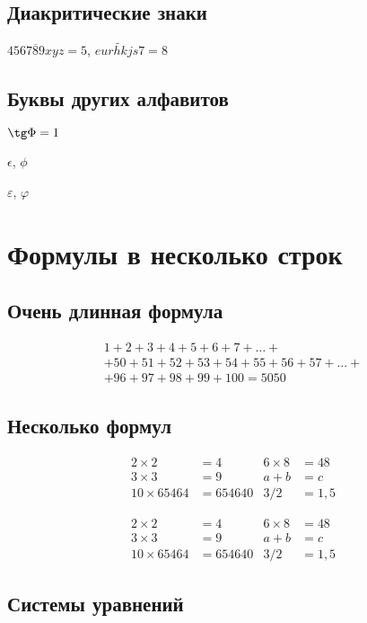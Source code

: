 \documentclass[a4paper,12pt]{article} %
\begin{document}
\subsection{Диакритические знаки}

$\overline{456789xyz}=5$, $\widetilde{eurhkjs7} = 8$

\subsection{Буквы других алфавитов}

$\tg \Phi = 1$

$\epsilon$, $\phi$

$\varepsilon$, $\varphi$

\section{Формулы в несколько строк}

\subsection{Очень длинная формула}

\begin{multline}
	1+ 2+3+4+5+6+7+\dots + \\
	+ 50+51+52+53+54+55+56+57 + \dots + \\
	+ 96+97+98+99+100=5050 \tag{S} \label{eq:sum}
\end{multline}


\subsection{Несколько формул}

\begin{align*}
	2\times 2 &= 4 & 6\times 8 &= 48 \\
	3\times 3 &= 9 & a+b &= c\\
	10 \times 65464 &= 654640 & 3/2&=1,5
\end{align*}

\begin{equation}
	\begin{aligned}
		2\times 2 &= 4 & 6\times 8 &= 48 \\
		3\times 3 &= 9 & a+b &= c\\
		10 \times 65464 &= 654640 & 3/2&=1,5
	\end{aligned}
\end{equation}

\subsection{Системы уравнений}
\end{document}
